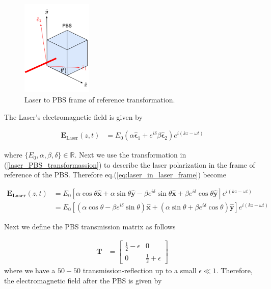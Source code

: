 \documentclass{article}
\begin{document}
\begin{figure}
\centering
\includegraphics[width=0.3\textwidth]{Theory/Figures/BPD_frame.png}
\caption{Laser to PBS frame of reference transformation.}
\label{fig:BPD_frame}
\end{figure}

The Laser's electromagnetic field is given by 

\begin{align}
    \mathbf{E}_{\text{Laser}}\left(z, t\right) &= E_0\left(\alpha\mathbf{\hat{\epsilon}}_1+e^{i\delta}\beta\mathbf{\hat{\epsilon}}_2\right)e^{i\left(k z-\omega t\right)}\label{eq:laser_in_laser_frame}
\end{align}

where $\lbrace E_0, \alpha, \beta, \delta \rbrace \in \mathbb{R}$. Next we use the transformation in (\ref{laser_PBS_transformassion}) to describe the laser polarization in the frame of reference of the PBS. Therefore eq.(\ref{eq:laser_in_laser_frame}) become

\begin{align}
    \mathbf{E}_{\textbf{Laser}}\left(z, t\right) &= E_0\left[\alpha\cos{\theta}\mathbf{\hat{x}}+\alpha\sin{\theta}\mathbf{\hat{y}}-\beta e^{i\delta}\sin{\theta}\mathbf{\hat{x}}+\beta e^{i\delta}\cos{\theta}\mathbf{\hat{y}}\right]e^{i\left(k z-\omega t\right)}\\
    &=E_0\left[\left(\alpha\cos{\theta}-\beta e^{i\delta}\sin{\theta} \right)\mathbf{\hat{x}}+\left(\alpha\sin{\theta}+\beta e^{i\delta}\cos{\theta}\right)\mathbf{\hat{y}}\right]e^{i\left(k z-\omega t\right)}
    \label{eq:laser_in_laser_frame}
\end{align}

Next we define the PBS transmission matrix as follows

\begin{align}
\mathbf{T} &= \left[ 
    \begin{array}{cc}
        \frac{1}{2} - \epsilon & 0 \\
        0 & \frac{1}{2} + \epsilon
    \end{array}
    \right]
\end{align}
 where we have a $50-50$ transmission-reflection up to a small $\epsilon\ll 1$. Therefore, the electromagnetic field after the PBS is given by
 
\end{document}
